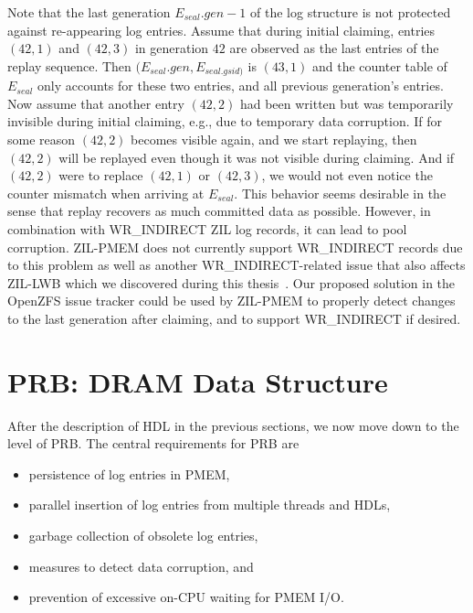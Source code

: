 \documentclass[12pt,a4paper,twoside]{book}
\begin{document}
Note that the last generation $E_{seal}.gen - 1$ of the log structure is not protected against re-appearing log entries.
Assume that during initial claiming, entries $(42,1)$ and $(42,3)$ in generation $42$ are observed as the last entries of the replay sequence.
Then $(E_{seal}.gen, E_{seal.gsid)}$ is $(43,1)$ and the counter table of $E_{seal}$ only accounts for these two entries, and all previous generation's entries.
Now assume that another entry $(42,2)$ had been written but was temporarily invisible during initial claiming, e.g., due to temporary data corruption.
If for some reason $(42,2)$ becomes visible again, and we start replaying, then $(42,2)$ will be replayed even though it was not visible during claiming.
And if $(42,2)$ were to replace $(42,1)$ or $(42,3)$, we would not even notice the counter mismatch when arriving at $E_{seal}$.
This behavior seems desirable in the sense that replay recovers as much committed data as possible.
However, in combination with WR\_INDIRECT ZIL log records, it can lead to pool corruption.
ZIL-PMEM does not currently support WR\_INDIRECT records due to this problem as well as another WR\_INDIRECT-related issue that also affects ZIL-LWB which we discovered during this thesis~\cite{OpenZFSGithubIssueZilLeaksClaimedBlocksInSeveralEdgeCases}.
Our proposed solution in the \mbox{OpenZFS} issue tracker could be used by ZIL-PMEM to properly detect changes to the last generation after claiming, and to support WR\_INDIRECT if desired.

\section{PRB: DRAM Data Structure}\label{di:prb:dramdatastructure}
After the description of HDL in the previous sections, we now move down to the level of PRB.
The central requirements for PRB are
\begin{itemize}[noitemsep]
    \item persistence of log entries in PMEM,
    \item parallel insertion of log entries from multiple threads and HDLs,
    \item garbage collection of obsolete log entries,
    \item measures to detect data corruption, and
    \item prevention of excessive on-CPU waiting for PMEM I/O.
\end{itemize}
\end{document}
